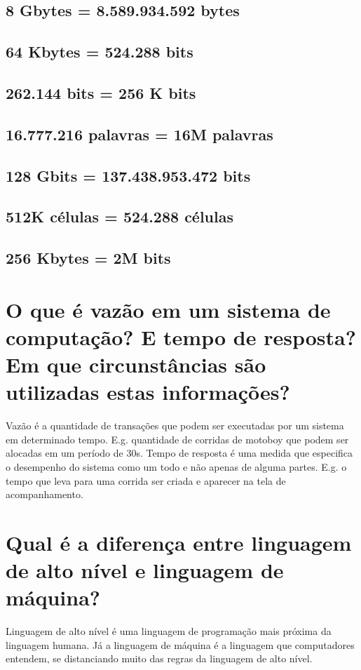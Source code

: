 \documentclass[
	12pt,				%
	openright,			%
	twoside,			%
	a4paper,			%
	english,			%
	french,				%
	spanish,			%
	brazil,				%
	]{abntex2}
\begin{document}
\subsection{8 Gbytes = 8.589.934.592 bytes}
\label{sec:orga58afc4}
\subsection{64 Kbytes = 524.288 bits}
\label{sec:orgabdbecc}
\subsection{262.144 bits = 256 K bits}
\label{sec:orgf73cc6f}
\subsection{16.777.216 palavras = 16M palavras}
\label{sec:org9624bff}
\subsection{128 Gbits = 137.438.953.472 bits}
\label{sec:org5a6ce74}
\subsection{512K células = 524.288 células}
\label{sec:org9a443a0}
\subsection{256 Kbytes = 2M bits}
\label{sec:orgbfeb965}
\section{O que é vazão em um sistema de computação? E tempo de resposta? Em que circunstâncias são utilizadas estas informações?}
\label{sec:org06a4274}
Vazão é a quantidade de transações que podem ser executadas por um sistema em
determinado tempo. E.g. quantidade de corridas de motoboy que podem ser alocadas
em um período de 30s.
Tempo de resposta é uma medida que especifica o desempenho do sistema como um
todo e não apenas de alguma partes. E.g. o tempo que leva para uma corrida ser
criada e aparecer na tela de acompanhamento.
\section{Qual é a diferença entre linguagem de alto nível e linguagem de máquina?}
\label{sec:org06bce34}
Linguagem de alto nível é uma linguagem de programação mais próxima da linguagem
humana. Já a linguagem de máquina é a linguagem que computadores entendem, se
distanciando muito das regras da linguagem de alto nível.
\end{document}
